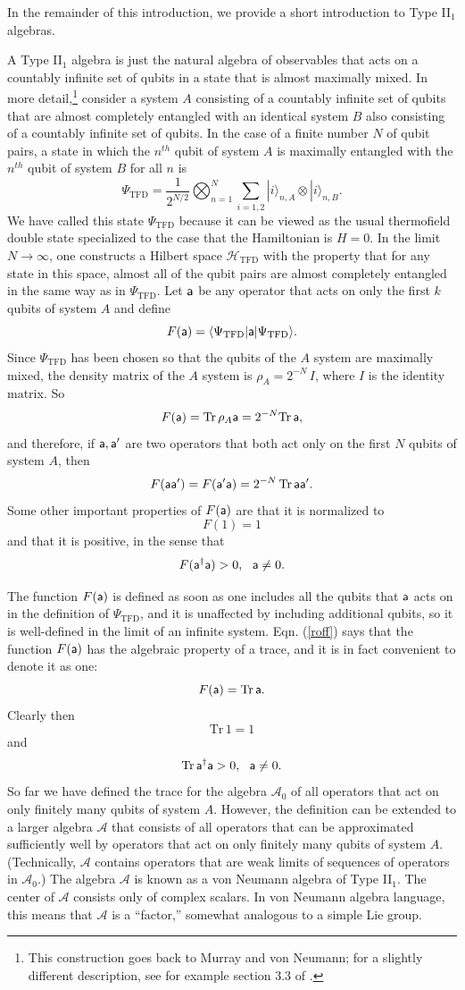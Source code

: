 \documentclass[11pt,a4paper]{article}
\def\a{{\sf a}}
\def\be{\begin{equation}}
\def\ee{\end{equation}}
\def\A{{\mathcal A}}
\def\H{{\mathcal H}}
\def\la{\langle}
\def\ra{\rangle}
\def\Tr{{\mathrm{Tr}}}
\def\TFD{{\mathrm{TFD}}}
\begin{document}
  In the remainder of this introduction, we provide a short introduction to Type II$_1$ algebras.
  
    A Type II$_1$ algebra is just the natural algebra of observables that acts on a countably infinite set of qubits in a state that is almost maximally mixed.
  In more detail,\footnote{This construction goes back to Murray and von Neumann; for a slightly
 different description, see for example section 3.3 of \cite{Curved}.}
consider a system $A$ consisting of a countably infinite set of qubits that are almost completely 
entangled with an identical system $B$ also consisting of a countably infinite set of qubits.  In the case of a finite number $N$ of qubit pairs, a state in which
the $n^{th}$ qubit of system $A$ is maximally entangled with the $n^{th}$ qubit of system $B$ for all $n$  is
\be\label{wacko}\Psi_{\TFD}=\frac{1}{2^{N/2}}\bigotimes_{n=1}^N \sum_{i=1,2}|i\ra_{n,A}\otimes |i\ra_{n,B}. \ee
We have called this state $\Psi_\TFD$ because it can be viewed as the usual thermofield double state specialized to the case that the Hamiltonian is $H=0$.
In the limit $N\to\infty$, one constructs a Hilbert space $\H_\TFD$ with the property that for any state in this space, almost all of the qubit pairs are almost
completely entangled in the same way as in $\Psi_\TFD$.  Let $\a$ be any operator that acts on only the first $k$ qubits of system $A$ and define
\be\label{zoff} F(\a)=\la\Psi_\TFD |\a|\Psi_\TFD\ra. \ee
   Since $\Psi_\TFD$ has been chosen
so that the qubits of the $A$ system are maximally mixed, the density matrix of the $A$ system is $\rho_A=2^{-N} \,I$, where $I$ is the identity matrix.
So 
\be\label{traceform} F(\a)= \Tr\,\rho_A \a =2^{-N}\Tr\,\a,\ee  
and therefore, if  $\a,\a'$ are two operators that both act only on the first $N$ qubits of system $A$, then
\be\label{roff} F(\a\a')=F(\a'\a)=2^{-N}\,\Tr\,\a\a'. \ee
Some other important properties of $F(\a)$ are that it is normalized to
\be\label{woffo} F(1)=1 \ee
and that it is positive, in the sense that
\be\label{zoffo}F(\a^\dagger\a)>0, ~~\a\not=0.\ee


The function $F(\a)$ is defined as soon as one includes all the qubits that $\a$ acts on in the definition of $\Psi_\TFD$,
and it is unaffected by including additional qubits, so it is well-defined in the limit of an infinite system. 
Eqn. (\ref{roff}) says that the  function $F(\a)$ has the algebraic property of a trace, and it is in fact convenient to denote it as one:
\be\label{omoff} F(\a)=\Tr\,\a. \ee Clearly then
\be\label{poff} \Tr\,1=1\ee
and
\be\label{woff}\Tr\,\a^\dagger\a>0,~~\a\not=0.\ee
So far we have defined the trace for the algebra $\A_0$ of all operators that act on only finitely many qubits of system $A$.   However, the definition
can be extended to a larger algebra $\A$ that consists of all operators that can be approximated sufficiently well by operators that act on only finitely
many qubits of system $A$.  (Technically, $\A$ contains operators that are weak limits of sequences of operators in $\A_0$.)   The algebra $\A$ is known
as a von Neumann algebra of Type II$_1$.    The center of $\A$ consists only of complex scalars.   In von Neumann algebra language, this means that
$\A$ is a ``factor,'' somewhat analogous to a simple Lie group.
\end{document}
